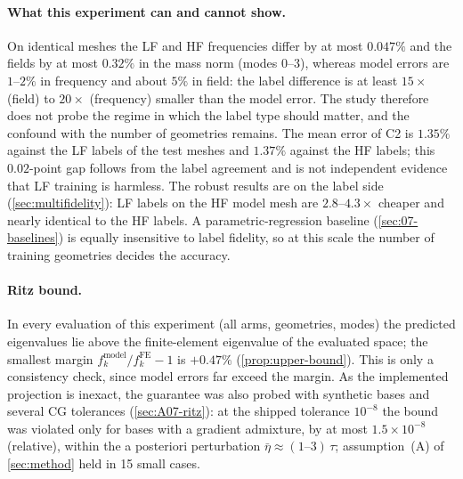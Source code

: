 \paragraph{What this experiment can and cannot show.} On identical meshes the LF and HF frequencies differ by at most $0.047\%$ and the fields by at most $0.32\%$ in the mass norm (modes 0--3), whereas model errors are $1$--$2\%$ in frequency and about $5\%$ in field: the label difference is at least $15\times$ (field) to $20\times$ (frequency) smaller than the model error.
The study therefore does not probe the regime in which the label type should matter, and the confound with the number of geometries remains. The mean error of C2 is $1.35\%$ against the LF labels of the test meshes and $1.37\%$ against the HF labels; this $0.02$-point gap follows from the label agreement and is not independent evidence that LF training is harmless.
The robust results are on the label side (\cref{sec:multifidelity}): LF labels on the HF model mesh are $2.8$--$4.3\times$ cheaper and nearly identical to the HF labels. A parametric-regression baseline (\cref{sec:07-baselines}) is equally insensitive to label fidelity, so at this scale the number of training geometries decides the accuracy.

\paragraph{Ritz bound.} In every evaluation of this experiment (all arms, geometries, modes) the predicted eigenvalues lie above the finite-element eigenvalue of the evaluated space; the smallest margin $f_k^{\mathrm{model}}/f_k^{\mathrm{FE}}-1$ is $+0.47\%$ (\cref{prop:upper-bound}). This is only a consistency check, since model errors far exceed the margin. As the implemented projection is inexact, the guarantee was also probed with synthetic bases and several CG tolerances (\cref{sec:A07-ritz}): at the shipped tolerance $10^{-8}$ the bound was violated only for bases with a gradient admixture, by at most $1.5\times10^{-8}$ (relative), within the a posteriori perturbation $\bar\eta\approx(1\text{--}3)\,\tau$; assumption~(A) of \cref{sec:method} held in 15 small cases.

